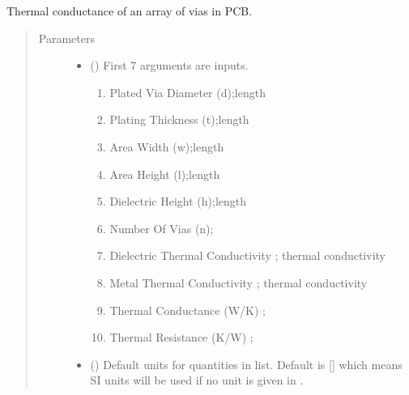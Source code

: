 \documentclass[letterpaper,10pt,english]{sphinxmanual}
\begin{document}

\begin{fulllineitems}
\label{\detokenize{components:components.thermal_conductance_of_via_farm}}
Thermal conductance of an array of vias in PCB.
\begin{quote}\begin{description}
\item[{Parameters}] \leavevmode\begin{itemize}
\item {} 
 () \textendash{} 
First 7 arguments are inputs.
\begin{enumerate}
%
\item {} 
Plated Via Diameter (d);length

\item {} 
Plating Thickness (t);length

\item {} 
Area Width (w);length

\item {} 
Area Height (l);length

\item {} 
Dielectric Height (h);length

\item {} 
Number Of Vias (n);

\item {} 
Dielectric Thermal Conductivity ;   thermal conductivity

\item {} 
Metal Thermal Conductivity ; thermal conductivity

\item {} 
Thermal Conductance (W/K) ;

\item {} 
Thermal Resistance (K/W) ;

\end{enumerate}


\item {} 
 (\sphinxstyleliteralemphasis{\sphinxupquote{, }}) \textendash{} Default units for quantities in  list. Default is {[}{]} which means SI units will be used if no unit is given in .


\end{itemize}
\end{description}
\end{quote}
\end{fulllineitems}
\end{document}

